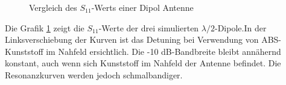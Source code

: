 
\begin{figure}[!ht]
	\centering
	\begingroup
	
	\endgroup
	\caption{Vergleich des $S_{11}$-Werts einer Dipol Antenne}
	\label{S11_Vergleich_Simulation}
\end{figure}
\newpage
Die Grafik \ref{S11_Vergleich_Simulation} zeigt die $S_{11}$-Werte der drei simulierten $\lambda/2$-Dipole.In der Linksverschiebung der Kurven ist das Detuning bei Verwendung von ABS-Kunststoff im Nahfeld ersichtlich. Die -10 dB-Bandbreite bleibt annähernd konstant, auch wenn sich Kunststoff im Nahfeld der Antenne befindet. Die Resonanzkurven werden jedoch schmalbandiger.

